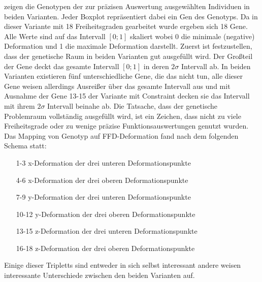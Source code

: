  zeigen die Genotypen der zur präzisen Auswertung ausgewählten Individuen in beiden Varianten.
Jeder Boxplot repräsentiert dabei ein Gen des Genotyps.
Da in dieser Variante mit 18 Freiheitsgraden gearbeitet wurde ergeben sich 18 Gene.
Alle Werte sind auf das Intervall $[0;1]$ skaliert wobei 0 die minimale (negative) Deformation und 1 die maximale Deformation darstellt.
Zuerst ist festzustellen, dass der genetische Raum in beiden Varianten gut ausgefüllt wird.
Der Großteil der Gene deckt das gesamte Intervall $[0;1]$ in deren $2\sigma$ Intervall ab.
In beiden Varianten existieren fünf unterschiedliche Gene, die das nicht tun, alle dieser Gene weisen allerdings Ausreißer über das gesamte Intervall aus und mit Ausnahme der Gene 13-15 der Variante mit Constraint decken sie das Intervall mit ihrem $2\sigma$ Intervall beinahe ab.
Die Tatsache, dass der genetische Problemraum vollständig ausgefüllt wird, ist ein Zeichen, dass nicht zu viele Freiheitsgrade oder zu wenige präzise Funktionsauswertungen genutzt wurden.
Das Mapping von Genotyp auf FFD-Deformation fand nach dem folgenden Schema statt:
\begin{enumerate}
	\item[1-3] x-Deformation der drei unteren Deformationspunkte
	\item[4-6] x-Deformation der drei oberen Deformationspunkte
	\item[7-9] y-Deformation der drei unteren Deformationspunkte
	\item[10-12] y-Deformation der drei oberen Deformationspunkte
	\item[13-15] z-Deformation der drei unteren Deformationspunkte
	\item[16-18] z-Deformation der drei oberen Deformationspunkte
\end{enumerate}

Einige dieser Tripletts sind entweder in sich selbst interessant andere weisen interessante Unterschiede zwischen den beiden Varianten auf.

